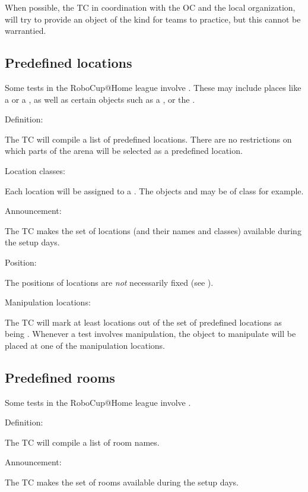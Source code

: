When possible, the TC in coordination with the OC and the local organization, will try to provide an object of the kind for teams to practice, but this cannot be warrantied.





\subsection{Predefined locations}
\label{rule:scenario_locations}

Some tests in the RoboCup@Home league involve . 
These may include places like a  or a , as well as certain objects such as a , or the . 

\begin{enumerate}
	{\bf\item Definition:} The TC will compile a list of predefined locations. There are no restrictions on which parts of the arena will be selected as a predefined location.

	{\bf\item Location classes:} Each location will be assigned to a . The objects  and  may be of class  for example. 

	{\bf\item Announcement:} The TC makes the set of locations (and their names and classes) available during the setup days.

	{\bf\item Position:} The positions of locations are \emph{not} necessarily fixed (see ).

	{\bf\item Manipulation locations:} The TC will mark at least \NumLocations locations out of the set of predefined locations as being . Whenever a test involves manipulation, the object to manipulate will be placed at one of the manipulation locations. 
\end{enumerate}



\subsection{Predefined rooms}
\label{rule:scenario_rooms}
Some tests in the RoboCup@Home league involve . 
\begin{enumerate}
	{\bf\item Definition:} The TC will compile a list of room names.
	{\bf\item Announcement:} The TC makes the set of rooms available during the setup days.
\end{enumerate}



